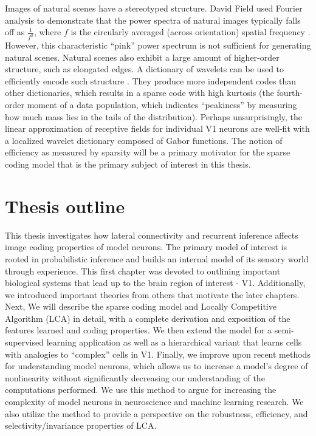 Images of natural scenes have a stereotyped structure. David Field used Fourier analysis to demonstrate that the power spectra of natural images typically falls off as $\tfrac{1}{f^{2}}$, where $f$ is the circularly averaged (across orientation) spatial frequency \parencite{field1987relations}. However, this characteristic ``pink'' power spectrum is not sufficient for generating natural scenes. Natural scenes also exhibit a large amount of higher-order structure, such as elongated edges. A dictionary of wavelets can be used to efficiently encode such structure \parencite{field1999wavelets}. They produce more independent codes than other dictionaries, which results in a sparse code with high kurtosis (the fourth-order moment of a data population, which indicates ``peakiness'' by measuring how much mass lies in the tails of the distribution). Perhaps unsurprisingly, the linear approximation of receptive fields for individual V1 neurons are well-fit with a localized wavelet dictionary composed of Gabor functions. The notion of efficiency as measured by sparsity will be a primary motivator for the sparse coding model that is the primary subject of interest in this thesis.

\section{Thesis outline}
This thesis investigates how lateral connectivity and recurrent inference affects image coding properties of model neurons. The primary model of interest is rooted in probabilistic inference and builds an internal model of its sensory world through experience. This first chapter was devoted to outlining important biological systems that lead up to the brain region of interest - V1. Additionally, we introduced important theories from others that motivate the later chapters. Next, We will describe the sparse coding model and Locally Competitive Algorithm (LCA) in detail, with a complete derivation and exposition of the features learned and coding properties. We then extend the model for a semi-supervised learning application as well as a hierarchical variant that learns cells with analogies to ``complex'' cells in V1. Finally, we improve upon recent methods for understanding model neurons, which allows us to increase a model's degree of nonlinearity without significantly decreasing our understanding of the computations performed. We use this method to argue for increasing the complexity of model neurons in neuroscience and machine learning research. We also utilize the method to provide a perspective on the robustness, efficiency, and selectivity/invariance properties of LCA.